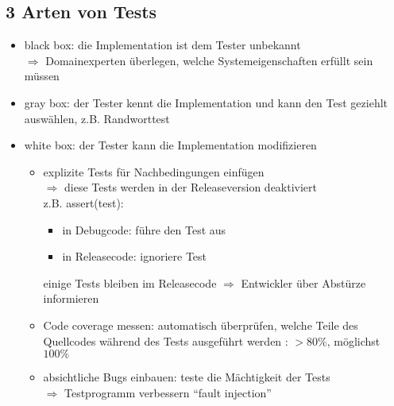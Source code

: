 \inputminted{python}{Programs/mysqrttest.py}

\subsection{3 Arten von Tests}
\begin{itemize}
    \item black box: die Implementation ist dem Tester unbekannt\\
    $\Rightarrow$ Domainexperten überlegen, welche Systemeigenschaften erfüllt sein müssen
    \item gray box: der Tester kennt die Implementation und kann den Test geziehlt auswählen, z.B. Randworttest
    \item white box: der Tester kann die Implementation modifizieren
    \begin{itemize}
        \item explizite Tests für Nachbedingungen einfügen \\
        $\Rightarrow$ diese Tests werden in der Releaseversion deaktiviert \\
        z.B. assert(test):
        \begin{itemize}
            \item in Debugcode: führe den Test aus
            \item in Releasecode: ignoriere Test
        \end{itemize}
        einige Tests bleiben im Releasecode $\Rightarrow$ Entwickler über Abstürze informieren
        \item Code coverage messen: automatisch überprüfen, welche Teile des Quellcodes während des Tests ausgeführt werden : $> 80\% $, möglichst $100\%$
        \item absichtliche Bugs einbauen: teste die Mächtigkeit der Tests\\
        $\Rightarrow$ Testprogramm verbessern ``fault injection''
    \end{itemize}
\end{itemize}

